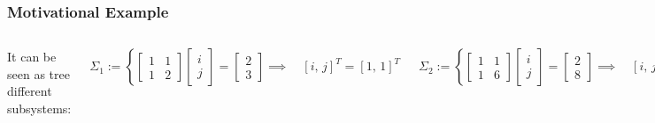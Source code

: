 \documentclass[aspectratio=169]{beamer}
\newcommand{\incfig}[2][1]{%
    \def\svgwidth{#1\columnwidth}
    {#2.pdf_tex} }
\begin{document}
\begin{frame} %
	\frametitle{Motivational Example}  %
	\begin{columns}

	

	
It can be seen as tree different subsystems:

\begin{equation*}
	\Sigma_1 := \left\{  \begin{bmatrix}	1 & 1 \\ 1 & 2	\end{bmatrix} \begin{bmatrix}	i \\ j	\end{bmatrix} = \begin{bmatrix} 2 \\ 3 \end{bmatrix}\right. \implies \quad [i, \, j]^T = [1, \, 1]^T
\end{equation*}

\begin{equation*}
	\Sigma_2 := \left\{  \begin{bmatrix}	1 & 1 \\ 1 & 6	\end{bmatrix} \begin{bmatrix}	i \\ j	\end{bmatrix} = \begin{bmatrix} 2 \\ 8 \end{bmatrix}\right. \implies \quad [i, \, j]^T = [0.8 , \, 1.2 ]^T
\end{equation*}

\begin{equation*}
	\Sigma_3 := \left\{  \begin{bmatrix}	1 & 2 \\ 1 & 6	\end{bmatrix} \begin{bmatrix}	i \\ j	\end{bmatrix} = \begin{bmatrix} 3 \\ 8 \end{bmatrix}\right. \implies \quad [i, \, j]^T = [0.5, \, 0.25]^T
\end{equation*}

	\begin{figure}[ht]
    		\centering
	    \incfig{satelite}
	\end{figure}
	\end{columns}


\end{frame}
\end{document}
